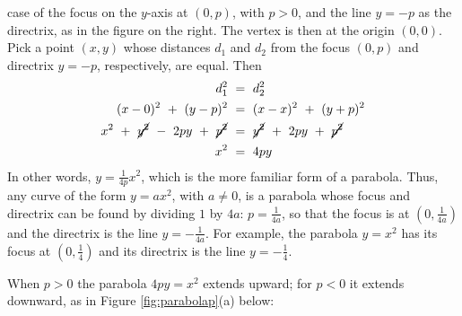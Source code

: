 case of the focus on the $y$-axis at $(0,p)$, with $p>0$, and the line $y=-p$ as
the directrix, as in the figure on the right. The vertex is then at the origin
$(0,0)$. Pick a point $(x,y)$ whose distances $d_1$ and $d_2$ from the focus
$(0,p)$ and directrix $y=-p$, respectively, are equal. Then
\begin{align*}
d_1^2 ~&=~ d_2^2\\
(x-0)^2 ~+~ (y-p)^2 ~&=~ (x-x)^2 ~+~ (y+p)^2\\
x^2 ~+~ \cancel{y^2} ~-~ 2py ~+~ \cancel{p^2} ~&=~ \cancel{y^2} ~+~ 2py ~+~ \cancel{p^2}\\
x^2 ~&=~ 4py
\end{align*}
In other words, $y = \frac{1}{4p}x^2$, which is the more familiar form of a
parabola. Thus, any curve of the form $y=ax^2$, with $a \ne 0$, is a parabola
whose focus and directrix can be found by dividing $1$ by $4a$:
$p = \frac{1}{4a}$, so that the focus is at $\left(0,\frac{1}{4a}\right)$ and the
directrix is the line $y=-\frac{1}{4a}$. For example, the parabola $y=x^2$ has
its focus at $\left(0,\frac{1}{4}\right)$ and its directrix is the line
$y=-\frac{1}{4}$.

When $p>0$ the parabola $4py = x^2$ extends upward; for $p<0$ it extends
downward, as in Figure \ref{fig:parabolap}(a) below:

